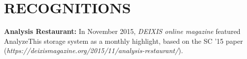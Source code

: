 \section{RECOGNITIONS}
\vspace{0.03in}

{\bf Analysis Restaurant:} In November 2015, \emph{DEIXIS online magazine} featured
AnalyzeThis storage system as a monthly highlight, based on the SC '15 paper
{\small(\emph{https://deixismagazine.org/2015/11/analysis-restaurant/})}.

